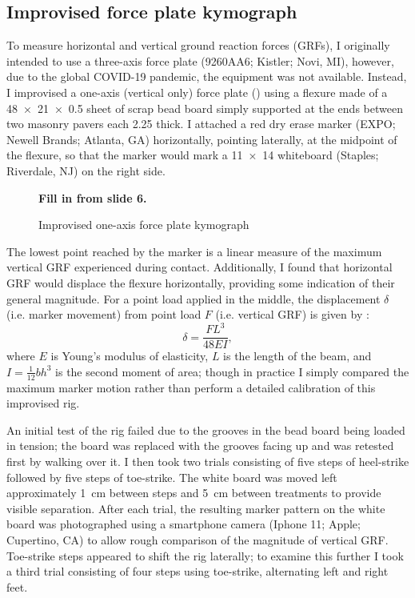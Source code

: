 \subsection{Improvised force plate kymograph}
To measure horizontal and vertical ground reaction forces (GRFs), I originally intended to use a three-axis force plate (9260AA6; Kistler; Novi, MI), however, due to the global COVID-19 pandemic, the equipment was not available. Instead, I improvised a one-axis (vertical only) force plate () using a flexure made of a \SI{48 x 21 x 0.5}{\inch} sheet of scrap bead board simply supported at the ends between two masonry pavers each \SI{2.25}{\inch} thick. I attached a red dry erase marker (EXPO; Newell Brands; Atlanta, GA) horizontally, pointing laterally, at the midpoint of the flexure, so that the marker would mark a \SI{11x14}{\inch} whiteboard (Staples; Riverdale, NJ) on the right side. 
\begin{figure}
\begin{center}
    \textbf{Fill in from slide 6.}
\end{center}
\caption{Improvised one-axis force plate kymograph}
\label{fig:methods:forceplate}
\end{figure}
The lowest point reached by the marker is a linear measure of the maximum vertical GRF experienced during contact. Additionally, I found that horizontal GRF would displace the flexure horizontally, providing some indication of their general magnitude. For a point load applied in the middle, the displacement $\delta$ (i.e. marker movement) from point load $F$ (i.e. vertical GRF) is given by \cite{craig2011mechanics}: 
\begin{equation}
\delta = \frac{FL^3}{48 EI},
\label{eq:sensor-response}
\end{equation}
where $E$ is Young's modulus of elasticity, $L$ is the length of the beam, and $I=\frac{1}{12}bh^3$ is the second moment of area; though in practice I simply compared the maximum marker motion rather than perform a detailed calibration of this improvised rig. 

An initial test of the rig failed due to the grooves in the bead board being loaded in tension; the board was replaced with the grooves facing up and was retested first by walking over it. I then took two trials consisting of five steps of heel-strike followed by five steps of toe-strike. The white board was moved left approximately \SI{1}{\centi\meter} between steps and \SI{5}{\centi\meter} between treatments to provide visible separation. After each trial, the resulting marker pattern on the white board was photographed using a smartphone camera (Iphone 11; Apple; Cupertino, CA) to allow rough comparison of the magnitude of vertical GRF. Toe-strike steps appeared to shift the rig laterally; to examine this further I took a third trial consisting of four steps using toe-strike, alternating left and right feet. 




